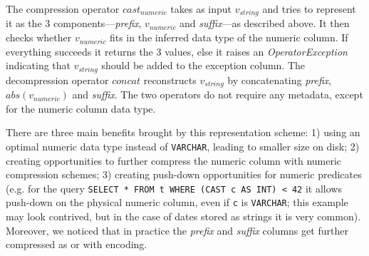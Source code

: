 The compression operator \(cast_{numeric}\) takes as input \(v_{string}\) and tries to represent it as the 3 components---\textit{prefix}, \(v_{numeric}\) and \textit{suffix}---as described above. It then checks whether \(v_{numeric}\) fits in the inferred data type of the numeric column. If everything succeeds it returns the 3 values, else it raises an \textit{OperatorException} indicating that \(v_{string}\) should be added to the exception column. The decompression operator \(concat\) reconstructs \(v_{string}\) by concatenating \textit{prefix}, \(abs(v_{numeric})\) and \textit{suffix}. The two operators do not require any metadata, except for the numeric column data type.

There are three main benefits brought by this representation scheme: 1) using an optimal numeric data type instead of \verb|VARCHAR|, leading to smaller size on disk; 2) creating opportunities to further compress the numeric column with numeric compression schemes; 3) creating push-down opportunities for numeric predicates (e.g. for the query \texttt{SELECT * FROM t WHERE (CAST c AS INT) < 42} it allows push-down on the physical numeric column, even if \verb|c| is \verb|VARCHAR|; this example may look contrived, but in the case of dates stored as strings it is very common). Moreover, we noticed that in practice the \textit{prefix} and \textit{suffix} columns get further compressed as  or with  encoding.

